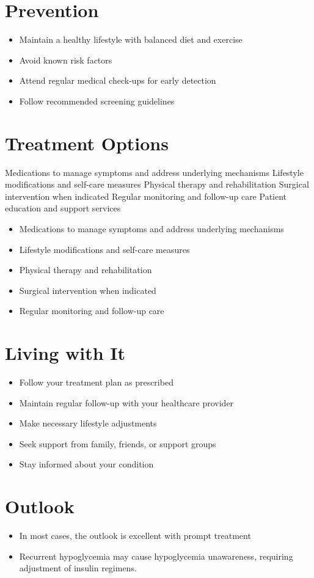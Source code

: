 \section{Prevention}
\begin{itemize}[noitemsep]
  \item Maintain a healthy lifestyle with balanced diet and exercise
  \item Avoid known risk factors
  \item Attend regular medical check-ups for early detection
  \item Follow recommended screening guidelines
\end{itemize}
\section{Treatment Options}
Medications to manage symptoms and address underlying mechanisms Lifestyle modifications and self-care measures Physical therapy and rehabilitation Surgical intervention when indicated Regular monitoring and follow-up care Patient education and support services

\begin{itemize}[noitemsep]
  \item Medications to manage symptoms and address underlying mechanisms
  \item Lifestyle modifications and self-care measures
  \item Physical therapy and rehabilitation
  \item Surgical intervention when indicated
  \item Regular monitoring and follow-up care
\end{itemize}
\section{Living with It}
\begin{itemize}[noitemsep]
  \item Follow your treatment plan as prescribed
  \item Maintain regular follow-up with your healthcare provider
  \item Make necessary lifestyle adjustments
  \item Seek support from family, friends, or support groups
  \item Stay informed about your condition
\end{itemize}
\section{Outlook}
\begin{itemize}[noitemsep]
  \item In most cases, the outlook is excellent with prompt treatment
  \item Recurrent hypoglycemia may cause hypoglycemia unawareness, requiring adjustment of insulin regimens.
\end{itemize}
